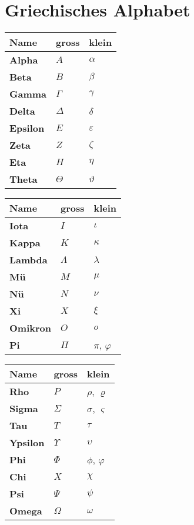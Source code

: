 \section{Griechisches Alphabet}
\setlength{\columnsep}{1.2pt}
\begin{multicols}{3}
\renewcommand{\arraystretch}{1.2}
	\begin{tabular}{|l|l|l|}
			\hline \textbf{Name} & \textbf{gross} & \textbf{klein}\\
			\hline \textbf{Alpha} &  $A$ & $\alpha$\\
			\hline \textbf{Beta} & $B$ & $\beta$ \\
			\hline \textbf{Gamma} & $\Gamma$ & $\gamma$ \\
			\hline \textbf{Delta} & $\Delta$ & $\delta$\\
			\hline \textbf{Epsilon} & $E$ & $\varepsilon$\\
			\hline \textbf{Zeta} & $Z$ & $\zeta$\\
			\hline \textbf{Eta} & $H$ & $\eta$\\
			\hline \textbf{Theta} & $\Theta$ & $\vartheta$\\
			\hline
	\end{tabular}
	
	\begin{tabular}{|l|l|l|}
		\hline \textbf{Name} & \textbf{gross} & \textbf{klein}\\
		\hline \textbf{Iota} &  $I$ & $\iota$\\
		\hline \textbf{Kappa} & $K$ & $\kappa$ \\
		\hline \textbf{Lambda} & $\Lambda$ & $\lambda$ \\
		\hline \textbf{Mü} & $M$ & $\mu$\\
		\hline \textbf{Nü} & $N$ & $\nu$\\
		\hline \textbf{Xi} & $X$ & $\xi$\\
		\hline \textbf{Omikron} & $O$ & $o$\\
		\hline \textbf{Pi} & $\Pi$ & $\pi$, $\varphi$\\
		\hline
	\end{tabular}
	
	\begin{tabular}{|l|l|l|}
		\hline \textbf{Name} & \textbf{gross} & \textbf{klein}\\
		\hline \textbf{Rho} &  $P$ & $\rho$, $\varrho$\\
		\hline \textbf{Sigma} & $\Sigma$ & $\sigma$, $\varsigma$ \\
		\hline \textbf{Tau} & $T$ & $\tau$ \\
		\hline \textbf{Ypsilon} & $\Upsilon$ & $\upsilon$\\
		\hline \textbf{Phi} & $\Phi$ & $\phi$, $\varphi$\\
		\hline \textbf{Chi} & $X$ & $\chi$\\
		\hline \textbf{Psi} & $\Psi$ & $\psi$\\
		\hline \textbf{Omega} & $\Omega$ & $\omega$\\
		\hline
	\end{tabular}	
\end{multicols}

